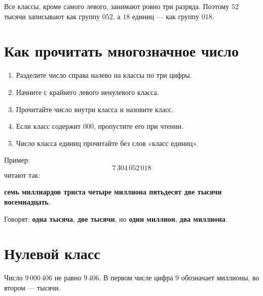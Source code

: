 \begin{notebox}
  Все классы, кроме самого левого, занимают ровно три разряда. Поэтому
  \(52\) тысячи записывают как группу \(052\), а \(18\) единиц --- как
  группу \(018\).
\end{notebox}

\section{Как прочитать многозначное число}

\readingroutefigure

\begin{conclusionbox}
  \begin{enumerate}
    \item Разделите число справа налево на классы по три цифры.
    \item Начните с крайнего левого ненулевого класса.
    \item Прочитайте число внутри класса и назовите класс.
    \item Если класс содержит \(000\), пропустите его при чтении.
    \item Число класса единиц прочитайте без слов «класс единиц».
  \end{enumerate}
\end{conclusionbox}

Пример:
\[
  7\,304\,052\,018
\]
читают так:

\begin{center}
  \textbf{семь миллиардов триста четыре миллиона\newline
  пятьдесят две тысячи восемнадцать}.
\end{center}

\begin{notebox}
  Говорят: \textbf{одна тысяча}, \textbf{две тысячи}, но
  \textbf{один миллион}, \textbf{два миллиона}.
\end{notebox}

\section{Нулевой класс}

\zeroclassfigure

\begin{warningbox}
  Число \(9\,000\,406\) не равно \(9\,406\). В первом числе цифра \(9\)
  обозначает миллионы, во втором --- тысячи.
\end{warningbox}


